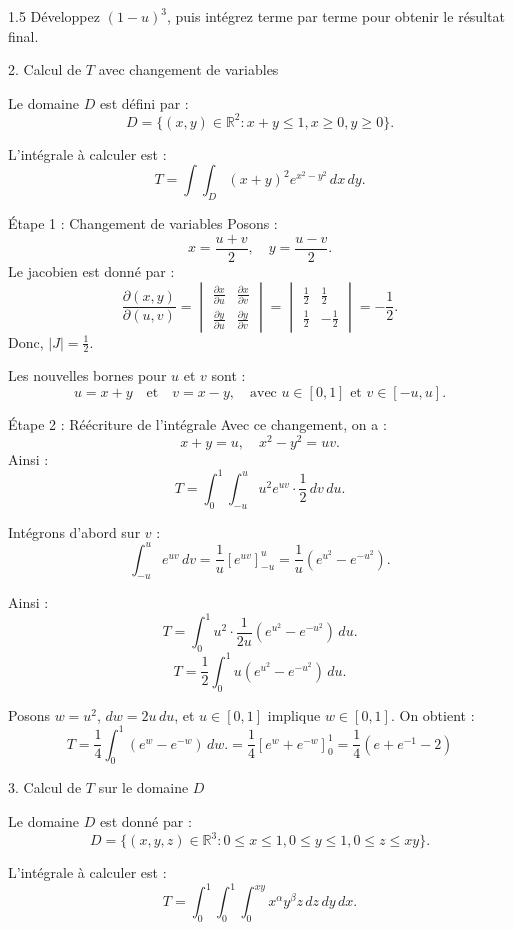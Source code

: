 \documentclass[12pt]{article}
\begin{document}
\begin{spacing}{1.5}
Développez $(1-u)^3$, puis intégrez terme par terme pour obtenir le résultat final.



2. Calcul de $T$ avec changement de variables

Le domaine $D$ est défini par :
\[
D = \{ (x, y) \in \mathbb{R}^2 : x + y \leq 1, x \geq 0, y \geq 0 \}.
\]

L'intégrale à calculer est :
\[
T = \int \int_D (x + y)^2 e^{x^2 - y^2} \, dx \, dy.
\]

Étape 1 : Changement de variables
Posons :
\[
x = \frac{u+v}{2}, \quad y = \frac{u-v}{2}.
\]
Le jacobien est donné par :
\[
\frac{\partial (x, y)}{\partial (u, v)} = 
\begin{vmatrix}
\frac{\partial x}{\partial u} & \frac{\partial x}{\partial v} \\
\frac{\partial y}{\partial u} & \frac{\partial y}{\partial v}
\end{vmatrix} =
\begin{vmatrix}
\frac{1}{2} & \frac{1}{2} \\
\frac{1}{2} & -\frac{1}{2}
\end{vmatrix} = -\frac{1}{2}.
\]
Donc, $|J| = \frac{1}{2}$.

Les nouvelles bornes pour $u$ et $v$ sont :
\[
u = x + y \quad \text{et} \quad v = x - y, \quad \text{avec } u \in [0, 1] \text{ et } v \in [-u, u].
\]

Étape 2 : Réécriture de l'intégrale
Avec ce changement, on a :
\[
x + y = u, \quad x^2 - y^2 = uv.
\]
Ainsi :
\[
T = \int_{0}^{1} \int_{-u}^{u} u^2 e^{uv} \cdot \frac{1}{2} \, dv \, du.
\]

Intégrons d'abord sur $v$ :
\[
\int_{-u}^{u} e^{uv} \, dv = \frac{1}{u} \left[ e^{uv} \right]_{-u}^{u} = \frac{1}{u} \left(e^{u^2} - e^{-u^2}\right).
\]

Ainsi :
\[
T = \int_{0}^{1} u^2 \cdot \frac{1}{2u} \left(e^{u^2} - e^{-u^2}\right) \, du.
\]
\[
T = \frac{1}{2} \int_{0}^{1} u \left(e^{u^2} - e^{-u^2}\right) \, du.
\]

Posons $w = u^2$, $dw = 2u \, du$, et $u \in [0, 1]$ implique $w \in [0, 1]$. On obtient :
\[
T = \frac{1}{4} \int_{0}^{1} (e^w - e^{-w}) \, dw.=\frac{1}{4}\left[e^w + e^{-w}\right]_0^1=\frac{1}{4}(e+e^{-1}-2)\]

3. Calcul de $T$ sur le domaine $D$

Le domaine $D$ est donné par :
\[
D = \{ (x, y, z) \in \mathbb{R}^3 : 0 \leq x \leq 1, 0 \leq y \leq 1, 0 \leq z \leq xy \}.
\]

L'intégrale à calculer est :
\[
T = \int_{0}^{1} \int_{0}^{1} \int_{0}^{xy} x^\alpha y^\beta z \, dz \, dy \, dx.
\]


\end{spacing}
\end{document}
